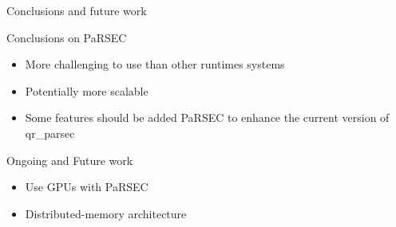 \documentclass{beamer}
\newcommand{\qrm}{\texttt{qr\_mumps}\xspace}
\begin{document}
\begin{frame}[plain]{Conclusions and future work}

  \begin{block}{Conclusions on PaRSEC}

    \begin{itemize}
    \item More challenging to use than other runtimes systems
    \item Potentially more scalable
    \item Some features should be added PaRSEC to enhance the current
      version of qr\_parsec
    \end{itemize}
    
  \end{block}

  \begin{block}{Ongoing and Future work}
    \begin{itemize}
    \item Use GPUs with PaRSEC   
    \item Distributed-memory architecture  
    \end{itemize}
  \end{block}
  
  

\end{frame}






\end{document}
